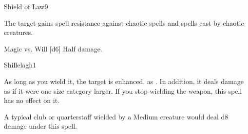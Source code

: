 \begin{spellsection}{Shield of Law}{9}
\begin{spellheader}
\end{spellheader}
\begin{spellcontent}
    \begin{spelltargetinginfo}
    \end{spelltargetinginfo}
    \begin{spelleffects}
        \spelleffect The target gains spell resistance against chaotic spells and spells cast by chaotic creatures.
        \spelldur \durshort \dismissable
    \end{spelleffects}
\end{spellcontent}
\begin{spellsubcontent}
    \begin{spelltargetinginfo}
    \end{spelltargetinginfo}
    \begin{spelleffects}
        \begin{spellattack}{Magic vs. Will}
            \spellsuccess {}[d6]
            \spellfailure Half damage.
        \end{spellattack}
    \end{spelleffects}
\end{spellsubcontent}
\begin{spellfooter}
\end{spellfooter}
\end{spellsection}

\begin{spellsection}{Shillelagh}{1}
\begin{spellheader}
    \begin{spelltargetinginfo}
    \end{spelltargetinginfo}
\end{spellheader}
\begin{spellcontent}
    \begin{spelleffects}
        \spelleffect As long as you wield it, the target is enhanced, as . In addition, it deals damage as if it were one size category larger. If you stop wielding the weapon, this spell has no effect on it.
        \spelldur \durshort
    \end{spelleffects}
\end{spellcontent}
\begin{spellfooter}
    \spellnotes A typical club or quarterstaff wielded by a Medium creature would deal d8 damage under this spell.
\end{spellfooter}
\end{spellsection}

